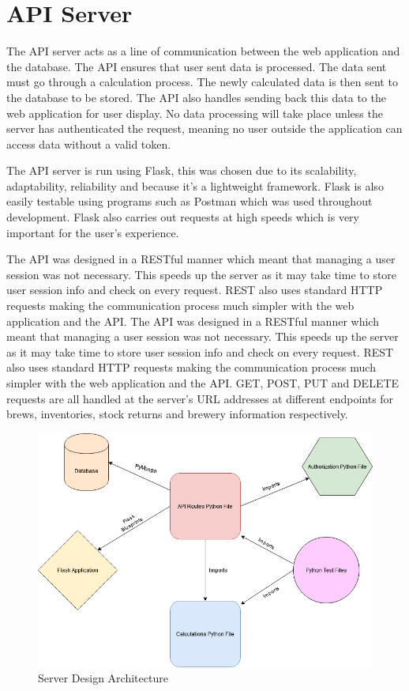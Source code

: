\section{API Server}
The API server acts as a line of communication between the web application and the database. The API ensures that user sent data is processed. The data sent must go through a calculation process. The newly calculated data is then sent to the database to be stored. The API also handles sending back this data to the web application for user display. No data processing will take place unless the server has authenticated the request, meaning no user outside the application can access data without a valid token. \par
The API server is run using Flask, this was chosen due to its scalability, adaptability, reliability and because it’s a lightweight framework. Flask is also easily testable using programs such as Postman which was used throughout development. Flask also carries out requests at high speeds which is very important for the user's experience.\par
The API was designed in a RESTful manner which meant that managing a user session was not necessary. This speeds up the server as it may take time to store user session info and check on every request. REST also uses standard HTTP requests making the communication process much simpler with the web application and the API. The API was designed in a RESTful manner which meant that managing a user session was not necessary. This speeds up the server as it may take time to store user session info and check on every request. REST also uses standard HTTP requests making the communication process much simpler with the web application and the API. GET, POST, PUT and DELETE requests are all handled at the server’s URL addresses at different endpoints for brews, inventories, stock returns and brewery information respectively.
\begin{figure}[h!]
 	\caption{Server Design Architecture}
	\label{image:serverdesign}
 	\centering
 	\includegraphics[width=1\textwidth]{Images/Server Structure.png}
\end{figure}

